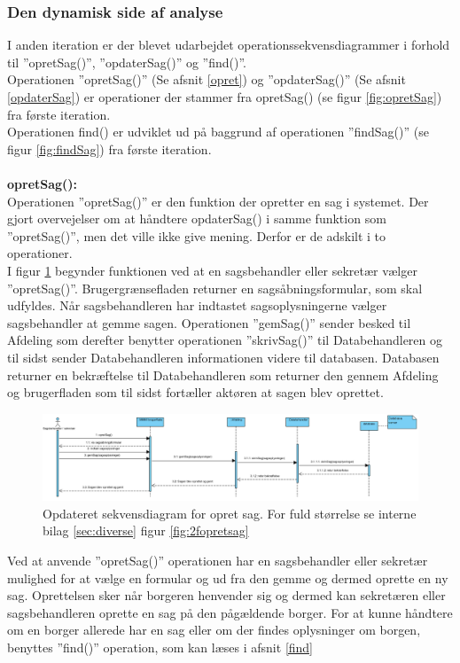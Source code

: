 \subsubsection{Den dynamisk side af analyse}
I anden iteration er der blevet udarbejdet operationssekvensdiagrammer i forhold til ”opretSag()”, ”opdaterSag()” og ”find()”. \\
Operationen ”opretSag()” (Se afsnit \ref{opret}) og ”opdaterSag()” (Se afsnit \ref{opdaterSag}) er operationer der stammer fra opretSag() (se figur \ref{fig:opretSag}) fra første iteration. \\
Operationen find() er udviklet ud på baggrund af operationen ”findSag()” (se figur \ref{fig:findSag}) fra første iteration.\\ \\
\textbf{opretSag():} \label{opret} \\ 
Operationen ”opretSag()” er den funktion der opretter en sag i systemet. Der gjort overvejelser om at håndtere opdaterSag() i samme funktion som ”opretSag()”, men det ville ikke give mening. Derfor er de adskilt i to operationer. \\
I figur \ref{fig:2opret} begynder funktionen ved at en sagsbehandler eller sekretær vælger ”opretSag()”. Brugergrænsefladen returner en sagsåbningsformular, som skal udfyldes. Når sagsbehandleren har indtastet sagsoplysningerne vælger sagsbehandler at gemme sagen. Operationen ”gemSag()” sender besked til Afdeling som derefter benytter operationen ”skrivSag()” til Databehandleren og til sidst sender Databehandleren informationen videre til databasen. Databasen returner en bekræftelse til Databehandleren som returner den gennem Afdeling og brugerfladen som til sidst fortæller aktøren at sagen blev oprettet.
\begin{figure}[htb!]
  \includegraphics[scale = 0.5]{./PNG/analyse/opretsag2.PNG} 
  \caption{Opdateret sekvensdiagram for opret sag. For fuld størrelse se interne bilag \ref{sec:diverse} figur \ref{fig:2fopretsag}}
  \label{fig:2opret}
\end{figure}
Ved at anvende ”opretSag()” operationen har en sagsbehandler eller sekretær mulighed for at vælge en formular og ud fra den gemme og dermed oprette en ny sag. Oprettelsen sker når borgeren henvender sig og dermed kan sekretæren eller sagsbehandleren oprette en sag på den pågældende borger. For at kunne håndtere om en borger allerede har en sag eller om der findes oplysninger om borgen, benyttes ”find()” operation, som kan læses i afsnit \ref{find} \\
